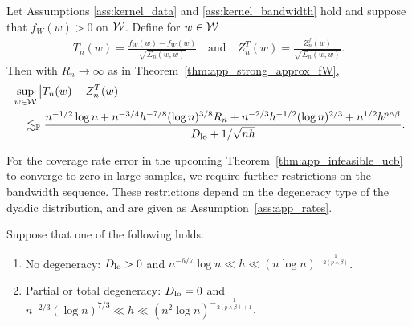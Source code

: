 \begin{lemma}
  \label{lem:infeasible_t_statistic}

  Let Assumptions \ref{ass:kernel_data} and
  \ref{ass:kernel_bandwidth}
  hold and suppose that
  $f_W(w) > 0$ on $\mathcal{W}$.
  Define for $w \in \mathcal{W}$
  \begin{align*}
    T_n(w) = \frac{\hat f_W(w) - f_W(w)}{\sqrt{\Sigma_n(w,w)}}
    \quad\text{and}\quad
    Z_n^T(w) = \frac{Z_n^f(w)}{\sqrt{\Sigma_n(w,w)}}.
  \end{align*}
  Then with $R_n \to \infty$ as in
  Theorem~\ref{thm:app_strong_approx_fW},
  \begin{align*}
    &\sup_{w \in \mathcal{W}} \left| T_n(w) - Z_n^T(w) \right| \\
    &\quad\lesssim_{\mathbb{P}}
    \frac{
      n^{-1/2} \log n
      + n^{-3/4} h^{-7/8} (\log n)^{3/8} R_n
      + n^{-2/3} h^{-1/2} (\log n)^{2/3}
      + n^{1/2} h^{p \wedge \beta}}
    {D_{\textup{lo}} + 1/\sqrt{nh}}.
  \end{align*}

\end{lemma}

For the coverage rate error
in the upcoming Theorem~\ref{thm:app_infeasible_ucb}
to converge to zero in large samples,
we require further restrictions on the bandwidth sequence.
These restrictions depend on the degeneracy type
of the dyadic distribution,
and are given as Assumption~\ref{ass:app_rates}.

\begin{assumption}
  \label{ass:app_rates}

  Suppose that one of the following holds.

  \begin{enumerate}[label=(\roman*)]

    \item
      No degeneracy:
      $D_{\textup{lo}} > 0$ and
      $n^{-6/7} \log n \ll h
      \ll (n \log n)^{-\frac{1}{2(p \wedge \beta)}}$.

    \item
      Partial or total degeneracy:
      $D_{\textup{lo}} = 0$ and
      $n^{-2/3} (\log n)^{7/3} \ll h
      \ll (n^2 \log n)^{-\frac{1}{2(p \wedge \beta) + 1}}$.

  \end{enumerate}

\end{assumption}

